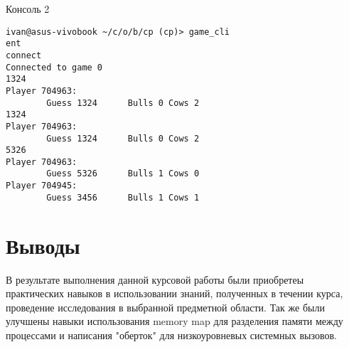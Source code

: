 \documentclass[a4paper, 12pt]{article}
\begin{document}
Консоль 2
\begin{verbatim}
ivan@asus-vivobook ~/c/o/b/cp (cp)> game_cli
ent
connect
Connected to game 0
1324
Player 704963:
        Guess 1324      Bulls 0 Cows 2
1324 
Player 704963:
        Guess 1324      Bulls 0 Cows 2
5326
Player 704963:
        Guess 5326      Bulls 1 Cows 0
Player 704945:
        Guess 3456      Bulls 1 Cows 1
\end{verbatim}

\newpage
\section{Выводы}
В результате выполнения данной курсовой работы были приобретеы практических навыков в использовании знаний, полученных
в течении курса, проведение исследования в выбранной предметной области. Так же были улучшены навыки использования
memory map для разделения памяти между процессами и написания "оберток" для низкоуровневых системных вызовов.
\end{document}
